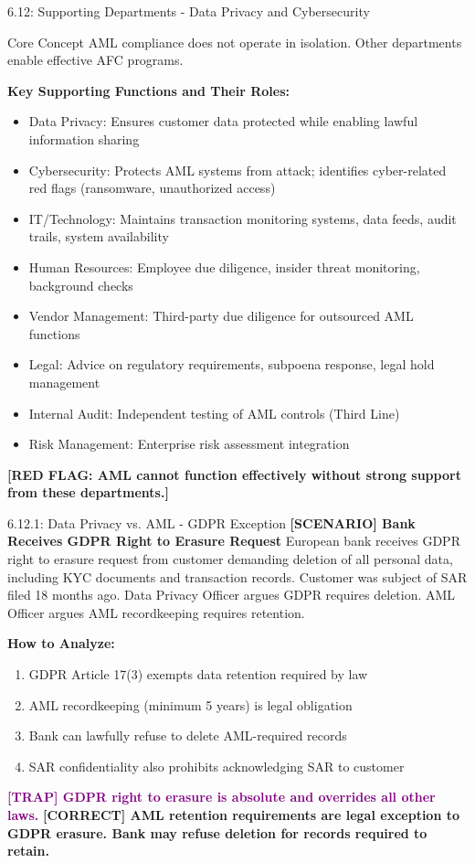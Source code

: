 \documentclass[11pt,a4paper]{beamer}
\newcommand{\trap}[1]{\textcolor{purple}{\textbf{[TRAP] #1}}}
\newcommand{\correct}[1]{\textcolor{green!50!black}{\textbf{[CORRECT] #1}}}
\newcommand{\scenario}[1]{\textcolor{blue!70!black}{\textbf{[SCENARIO] #1}}}
\newcommand{\redflag}[1]{\textcolor{red!80!black}{\textbf{[RED FLAG: #1]}}}
\begin{document}
\begin{frame}{6.12: Supporting Departments - Data Privacy and Cybersecurity}
	\begin{block}{Core Concept}
		AML compliance does not operate in isolation. Other departments enable effective AFC programs.
	\end{block}
	\textbf{Key Supporting Functions and Their Roles:}
	\begin{itemize}
		\item Data Privacy: Ensures customer data protected while enabling lawful information sharing
		\item Cybersecurity: Protects AML systems from attack; identifies cyber-related red flags (ransomware, unauthorized access)
		\item IT/Technology: Maintains transaction monitoring systems, data feeds, audit trails, system availability
		\item Human Resources: Employee due diligence, insider threat monitoring, background checks
		\item Vendor Management: Third-party due diligence for outsourced AML functions
		\item Legal: Advice on regulatory requirements, subpoena response, legal hold management
		\item Internal Audit: Independent testing of AML controls (Third Line)
		\item Risk Management: Enterprise risk assessment integration
	\end{itemize}
	\redflag{AML cannot function effectively without strong support from these departments.}
\end{frame}

\begin{frame}{6.12.1: Data Privacy vs. AML - GDPR Exception}
	\scenario{Bank Receives GDPR Right to Erasure Request}
	European bank receives GDPR right to erasure request from customer demanding deletion of all personal data, including KYC documents and transaction records. Customer was subject of SAR filed 18 months ago. Data Privacy Officer argues GDPR requires deletion. AML Officer argues AML recordkeeping requires retention.
	
	\vspace{0.1cm}
	\textbf{How to Analyze:}
	\begin{enumerate}
		\item GDPR Article 17(3) exempts data retention required by law
		\item AML recordkeeping (minimum 5 years) is legal obligation
		\item Bank can lawfully refuse to delete AML-required records
		\item SAR confidentiality also prohibits acknowledging SAR to customer
	\end{enumerate}
	\trap{GDPR right to erasure is absolute and overrides all other laws.}
	\correct{AML retention requirements are legal exception to GDPR erasure. Bank may refuse deletion for records required to retain.}
\end{frame}
\end{document}
